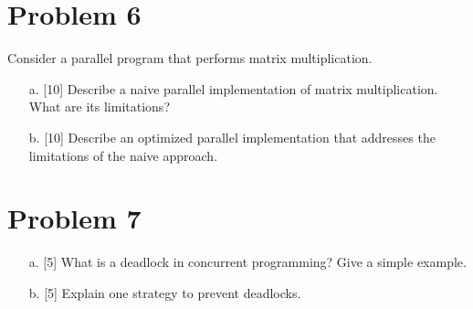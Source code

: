 \documentclass{article}
\begin{document}
\section*{Problem 6}
Consider a parallel program that performs matrix multiplication.

\begin{enumerate}
    \item[a.] [10] Describe a naive parallel implementation of matrix multiplication.  What are its limitations?
    \item[b.] [10] Describe an optimized parallel implementation that addresses the limitations of the naive approach.
\end{enumerate}


\section*{Problem 7}
\begin{enumerate}
    \item[a.] [5] What is a deadlock in concurrent programming? Give a simple example.
    \item[b.] [5] Explain one strategy to prevent deadlocks.
\end{enumerate}
\end{document}
